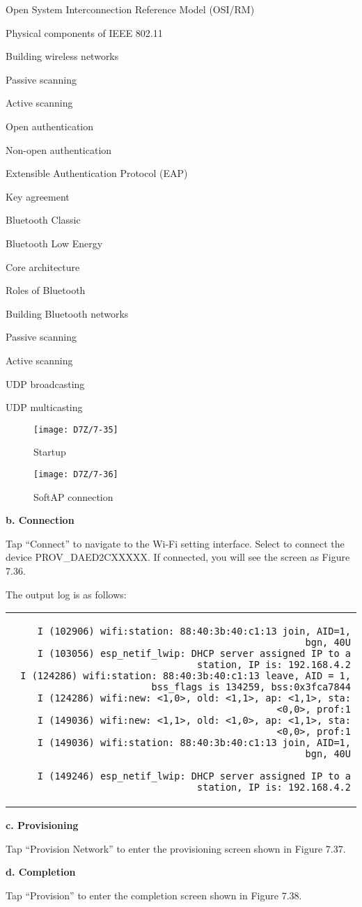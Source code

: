 \documentclass[a4paper,12pt]{book}
\begin{document}
\begin{term}{Open System Interconnection Reference Model (OSI/RM)}
\begin{term}{Physical components of IEEE 802.11}
\begin{term}{Building wireless networks}
\begin{term}{Passive scanning}
\begin{term}{Active scanning}
\begin{term}{Open authentication}
\begin{term}{Non-open authentication}
\begin{term}{Extensible Authentication Protocol (EAP)}
\begin{term}{Key agreement}
\begin{term}{Bluetooth Classic}
\begin{term}{Bluetooth Low Energy}
\begin{term}{Core architecture}
\begin{term}{Roles of Bluetooth}
\begin{term}{Building Bluetooth networks}
\begin{term}{Passive scanning}
\begin{term}{Active scanning}
\begin{term}{UDP broadcasting}
\begin{term}{UDP multicasting}
\begin{figure}[!h]
  \Centering
  \begin{minipage}[b]{0.4\textwidth}
    \texttt{[image: D7Z/7-35]}
    \caption{Startup}
  \end{minipage}\hspace{1em}
  \begin{minipage}[b]{0.4\textwidth}
    \texttt{[image: D7Z/7-36]}
    \caption{SoftAP connection}
  \end{minipage}
\end{figure}

\textbf{b. Connection}

Tap “Connect” to navigate to the Wi-Fi setting interface. Select to connect the device PROV\_DAED2CXXXXX. If connected, you will see the screen as Figure 7.36.

The output log is as follows:


\fontsize{8pt}{8pt}\selectfont
\begin{tabular}{d}
\vspace{2pt}
\begin{verbatim}
I (102906) wifi:station: 88:40:3b:40:c1:13 join, AID=1, bgn, 40U
I (103056) esp_netif_lwip: DHCP server assigned IP to a station, IP is: 192.168.4.2
I (124286) wifi:station: 88:40:3b:40:c1:13 leave, AID = 1, bss_flags is 134259, bss:0x3fca7844
I (124286) wifi:new: <1,0>, old: <1,1>, ap: <1,1>, sta: <0,0>, prof:1
I (149036) wifi:new: <1,1>, old: <1,0>, ap: <1,1>, sta: <0,0>, prof:1
I (149036) wifi:station: 88:40:3b:40:c1:13 join, AID=1, bgn, 40U
\end{verbatim}
\verb|I (149246) esp_netif_lwip: DHCP server assigned IP to a station, IP is: 192.168.4.2|
\end{tabular}


\textbf{c. Provisioning}

Tap “Provision Network” to enter the provisioning screen shown in Figure 7.37.

\textbf{d. Completion}

Tap “Provision” to enter the completion screen shown in Figure 7.38.


\end{term}
\end{term}
\end{term}
\end{term}
\end{term}
\end{term}
\end{term}
\end{term}
\end{term}
\end{term}
\end{term}
\end{term}
\end{term}
\end{term}
\end{term}
\end{term}
\end{term}
\end{term}
\end{document}
